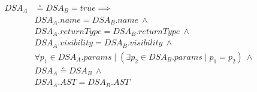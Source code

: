 
\begin{equation}
\begin{split}
  DSA_{A} & \circeq DSA_{B} = true \implies \\
   & DSA_{A}.name = DSA_{B}.name ~ \wedge \\
   & DSA_{A}.returnType = DSA_{B}.returnType ~ \wedge \\
   & DSA_{A}.visibility = DSA_{B}.visibility ~ \wedge \\
   & \forall p_1 \in DSA_{A}.params \mid (\exists p_2 \in DSA_{B}.params \mid p_1 = p_2)  ~ \wedge \\
   & DSA_{A} \circeq DSA_{B} ~ \wedge \\
   & DSA_{A}.AST = DSA_{B}.AST
 \end{split}
\end{equation}



